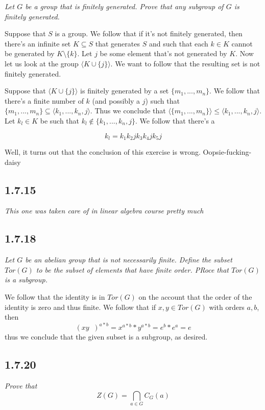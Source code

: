 \documentclass[11pt,oneside,titlepage]{book}
\DeclareMathOperator \inv {^{-1}}
\newcommand{\eangle}[1]{\langle #1 \rangle}
\newcommand{\set}[1]{\{ #1 \}}
\begin{document}
\textit{Let $G$ be a group that is finitely generated. Prove that any subgroup of $G$ is finitely
  generated.}

Suppose that $S$ is a group. We follow that if it's not finitely generated, then there's an
infinite set $K \subseteq S$ that generates $S$ and such that each $k \in K$ cannot be generated
by $K \setminus \set{k}$. Let $j$ be some element that's not generated by $K$. Now let us
look at the group $\eangle{K \cup \set{j}}$. We want to follow that the resulting set is not
finitely generated. 

Suppose that $\eangle{K \cup \set{j}}$ is finitely generated by a set
$\set{m_1, ..., m_n}$. We follow that there's a finite number of $k$ (and possibly a $j$)
such that $\set{m_1, ..., m_n} \subseteq \eangle{k_1, ..., k_n, j}$. Thus we conclude that
$\eangle{\set{m_1, ..., m_n}} \leq \eangle{k_1, ..., k_n, j}$. Let $k_l \in K$ be such that
$k_l \notin \set{k_1, ..., k_n, j}$. We follow that there's a

$$k_l = k_1 k_2 j k_3 k_4 j k_5 j$$

Well, it turns out that the conclusion of this exercise is wrong.
Oopsie-fucking-daisy

\subsection*{1.7.15}

\textit{This one was taken care of in linear algebra course pretty much}

\subsection*{1.7.18}

\textit{Let $G$ be an abelian group that is not necessarily finite. Define the subset $Tor(G)$
  to be the subset of elements that have finite order. PRoce that $Tor(G)$ is a subgroup.}

We follow that the identity is in $Tor(G)$ on the account that the order of the identity is zero
and thus finite. We follow that if $x, y \in Tor(G)$ with orders $a, b$, then
$$(xy\inv)^{a * b} = x^{a * b} * y^{a * b} = e^b * e ^a  = e$$
thus we conclude that the given subset is a subgroup, as desired.

\subsection*{1.7.20}

\textit{Prove that $$Z(G) = \bigcap_{a \in G}{C_G(a)}$$}
\end{document}
